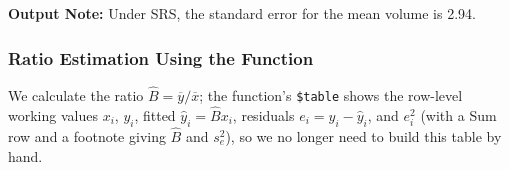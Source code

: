 \documentclass[
  letterpaper,
  DIV=11,
  numbers=noendperiod]{scrreprt}
\newenvironment{Shaded}{\begin{snugshade}}{\end{snugshade}}
\newcommand{\AttributeTok}[1]{\textcolor[rgb]{0.40,0.45,0.13}{#1}}
\newcommand{\DecValTok}[1]{\textcolor[rgb]{0.68,0.00,0.00}{#1}}
\newcommand{\FunctionTok}[1]{\textcolor[rgb]{0.28,0.35,0.67}{#1}}
\newcommand{\NormalTok}[1]{\textcolor[rgb]{0.00,0.23,0.31}{#1}}
\newcommand{\OtherTok}[1]{\textcolor[rgb]{0.00,0.23,0.31}{#1}}
\newcommand{\SpecialCharTok}[1]{\textcolor[rgb]{0.37,0.37,0.37}{#1}}
\newcommand{\StringTok}[1]{\textcolor[rgb]{0.13,0.47,0.30}{#1}}
\renewcommand{\[}{\begin{equation}}
\renewcommand{\]}{\end{equation}}
\begin{document}
\textbf{Output Note:} Under SRS, the standard error for the mean volume
is 2.94.

\subsubsection{Ratio Estimation Using the
Function}\label{ratio-estimation-using-the-function}

We calculate the ratio \(\hat{B} = \overline{y}/\overline{x}\); the
function's \texttt{\$table} shows the row-level working values \(x_i\),
\(y_i\), fitted \(\hat{y}_i = \hat{B}x_i\), residuals
\(e_i = y_i - \hat{y}_i\), and \(e_i^2\) (with a Sum row and a footnote
giving \(\hat B\) and \(s_e^2\)), so we no longer need to build this
table by hand.

\begin{Shaded}
\end{Shaded}
\end{document}
